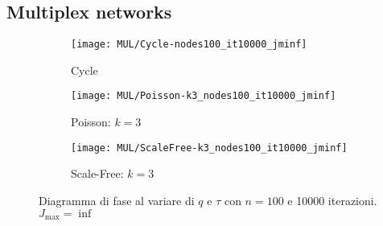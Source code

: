 \subsection{Multiplex networks}\label{subsec:app-multiplex-networks}
    \begin{figure}[H]
        \begin{minipage}{\linewidth}
            \centering
            \begin{minipage}{0.45\linewidth}
                \begin{figure}
                    \texttt{[image: MUL/Cycle-nodes100\_it10000\_jminf]}\caption{Cycle}
                    \label{fig:mul_cycle}
                \end{figure}
            \end{minipage}
            \hspace{0.05\linewidth}
            \begin{minipage}{0.45\linewidth}
                \begin{figure}
                    \texttt{[image: MUL/Poisson-k3\_nodes100\_it10000\_jminf]}\caption{Poisson: $k=3$}
                    \label{fig:mul_poisson_k_3}
                \end{figure}
            \end{minipage}
            \begin{minipage}{0.45\linewidth}
                \begin{figure}
                    \texttt{[image: MUL/ScaleFree-k3\_nodes100\_it10000\_jminf]}\caption{Scale-Free: $k=3$}
                    \label{fig:mul_scale_free_k_3}
                \end{figure}
            \end{minipage}
            \caption{Diagramma di fase al variare di $q$ e $\tau$ con $n=100$ e 10000 iterazioni. $J_{\max}=\inf$}
        \end{minipage}
    \end{figure}

